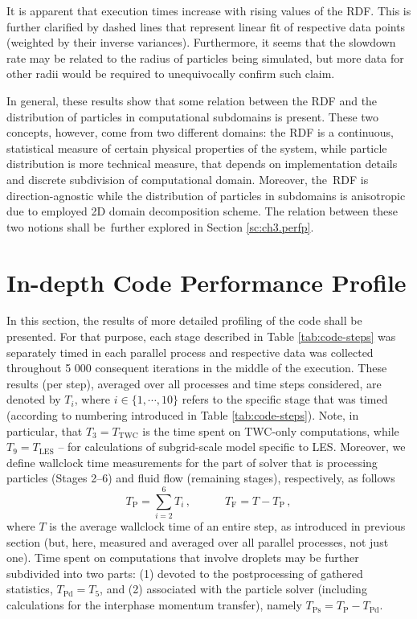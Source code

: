 \documentclass{pracamgren}
\begin{document}
It is apparent that execution times increase with rising values of the RDF. 
This is further clarified by dashed lines that represent linear fit of respective data points (weighted by their inverse variances). 
Furthermore, it seems that the slowdown rate may be related to the radius of particles being simulated, but more data for other radii would be required to unequivocally confirm such claim.

In general, these results show that some relation between the RDF and the distribution of particles in computational subdomains is present.
These two concepts, however, come from two different domains: the RDF is a continuous, statistical measure of certain physical properties of the system, while particle distribution is more technical measure, that depends on implementation details and discrete subdivision of computational domain.
Moreover, the~RDF is direction-agnostic while the distribution of particles in subdomains is anisotropic due to employed 2D domain decomposition scheme.
The relation between these two notions shall be~further explored in Section \ref{sc:ch3.perfp}.




\section{In-depth Code Performance Profile}
\label{sc:ch3.pprof}

In this section, the results of more detailed profiling of the code shall be presented.
For that purpose, each stage described in Table \ref{tab:code-steps} was separately timed in each parallel process and respective data was collected throughout 5 000 consequent iterations in the middle of the execution.
These results (per step), averaged over all processes and time steps considered, are denoted by  $T_i$, where $i \in \{ 1, \cdots, 10 \}$ refers to the specific stage that was timed (according to numbering introduced in Table \ref{tab:code-steps}).
Note, in particular, that $T_3 = T_{\text{TWC}}$ is the time spent on TWC-only computations, while $T_9 = T_{\text{LES}}$ -- for calculations of subgrid-scale model specific to LES.
Moreover, we define wallclock time measurements for the part of solver that is processing particles (Stages 2--6) and fluid flow (remaining stages), respectively, as follows
\begin{equation}
T_{\text{P}} = \sum_{i=2}^{6} T_i \, , \quad \quad \quad T_{\text{F}} = T - T_{\text{P}} \, ,
\label{eqn:pff-tp-tf}
\end{equation}
where $T$ is the average wallclock time of an entire step, as introduced in previous section (but, here, measured and averaged over all parallel processes, not just one).
Time spent on computations that involve droplets may be further subdivided into two parts: (1) devoted to the postprocessing of gathered statistics, $T_{\text{Pd}} = T_5$, and (2) associated with the particle solver (including calculations for the interphase momentum transfer), namely $T_{\text{Ps}} = T_{\text{P}} - T_{\text{Pd}}$.
\end{document}
